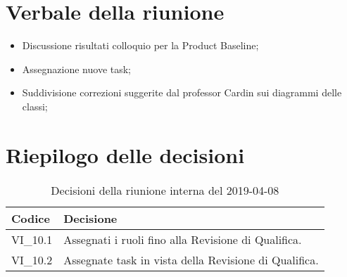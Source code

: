 \section{Verbale della riunione}
\begin{itemize}
	\item Discussione risultati colloquio per la Product Baseline\glo;
	\item Assegnazione nuove task;
	\item Suddivisione correzioni suggerite dal professor Cardin sui diagrammi 
	delle classi;
	
\end{itemize}

\hspace{3cm}

\section{Riepilogo delle decisioni}

	
	\begin{longtable}{ >{\centering}p{} >{}p{}}
		\caption{Decisioni della riunione interna del 2019-04-08}\\	
		\rowcolorhead
		\textbf{\color{white}Codice} 
		& \centering\textbf{\color{white}Decisione} 
		\tabularnewline 
		\endfirsthead
		VI\_10.1 & Assegnati i ruoli fino alla Revisione di Qualifica.
		\tabularnewline 
		VI\_10.2 & Assegnate task in vista della Revisione di Qualifica.\\
		
	\end{longtable}
	




